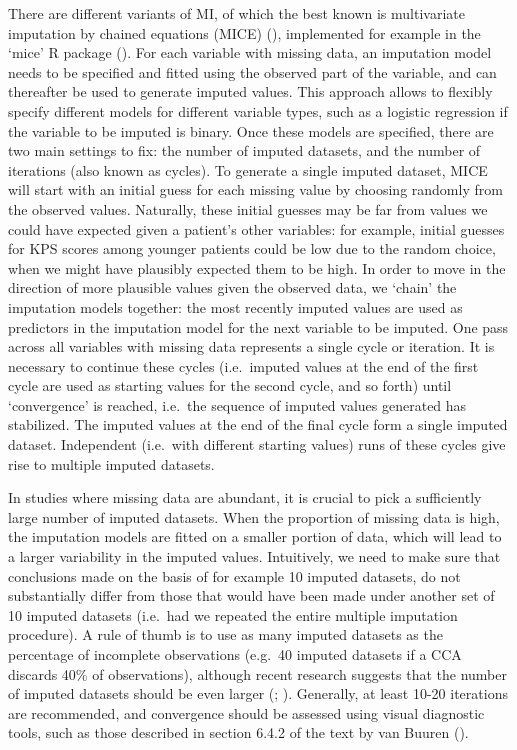 \documentclass[
  letterpaper,
  DIV=11,
  numbers=noendperiod]{scrreprt}
\begin{document}
There are different variants of MI, of which the best known is
multivariate imputation by chained equations (MICE)
(), implemented for example in the `mice' R package
(). For each variable with missing data, an
imputation model needs to be specified and fitted using the observed
part of the variable, and can thereafter be used to generate imputed
values. This approach allows to flexibly specify different models for
different variable types, such as a logistic regression if the variable
to be imputed is binary. Once these models are specified, there are two
main settings to fix: the number of imputed datasets, and the number of
iterations (also known as cycles). To generate a single imputed dataset,
MICE will start with an initial guess for each missing value by choosing
randomly from the observed values. Naturally, these initial guesses may
be far from values we could have expected given a patient's other
variables: for example, initial guesses for KPS scores among younger
patients could be low due to the random choice, when we might have
plausibly expected them to be high. In order to move in the direction of
more plausible values given the observed data, we `chain' the imputation
models together: the most recently imputed values are used as predictors
in the imputation model for the next variable to be imputed. One pass
across all variables with missing data represents a single cycle or
iteration. It is necessary to continue these cycles (i.e.~imputed values
at the end of the first cycle are used as starting values for the second
cycle, and so forth) until `convergence' is reached, i.e.~the sequence
of imputed values generated has stabilized. The imputed values at the
end of the final cycle form a single imputed dataset. Independent
(i.e.~with different starting values) runs of these cycles give rise to
multiple imputed datasets.

In studies where missing data are abundant, it is crucial to pick a
sufficiently large number of imputed datasets. When the proportion of
missing data is high, the imputation models are fitted on a smaller
portion of data, which will lead to a larger variability in the imputed
values. Intuitively, we need to make sure that conclusions made on the
basis of for example 10 imputed datasets, do not substantially differ
from those that would have been made under another set of 10 imputed
datasets (i.e.~had we repeated the entire multiple imputation
procedure). A rule of thumb is to use as many imputed datasets as the
percentage of incomplete observations (e.g.~40 imputed datasets if a CCA
discards 40\% of observations), although recent research suggests that
the number of imputed datasets should be even larger
(; ). Generally, at least 10-20 iterations are recommended,
and convergence should be assessed using visual diagnostic tools, such
as those described in section 6.4.2 of the text by van Buuren
().
\end{document}
